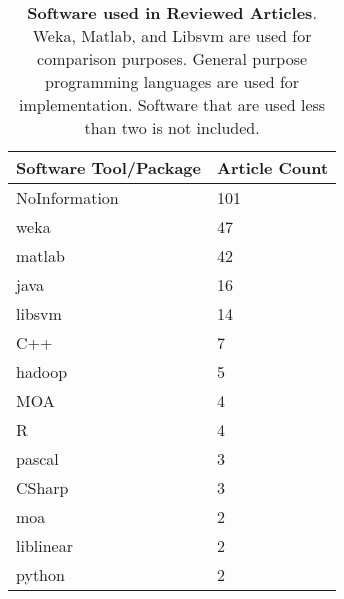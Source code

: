 
\begin{table}[!ht]
\centering 

    \caption{ \textbf{Software used in Reviewed Articles}. Weka, Matlab, and Libsvm are used for comparison purposes. General purpose programming languages are used for implementation. Software that are used less than two is not included. }
    \label{table-metaSoftwareUsed}

\begin{tabular}{ll}

\toprule

\textbf{Software Tool/Package  }                  & \textbf{Article Count }\\

\midrule
NoInformation & 101 \\ 
weka & 47 \\ 
matlab & 42 \\ 
java & 16 \\ 
libsvm & 14 \\ 
C++ & 7 \\ 
hadoop & 5 \\ 
MOA & 4 \\ 
R & 4 \\ 
pascal & 3 \\ 
CSharp & 3 \\ 
moa & 2 \\ 
liblinear & 2 \\ 
python & 2 \\ 

\bottomrule

\end{tabular}

\end{table}

